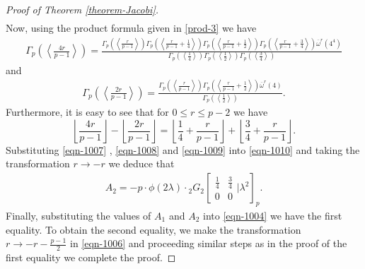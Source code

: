 \documentclass[12pt]{amsart}
\theoremstyle{plain}
\theoremstyle{definition}
\theoremstyle{remark}
\numberwithin{equation}{section}
\begin{document}
\begin{proof}[Proof of Theorem \ref{theorem-Jacobi}]
\begin{align}
\end{align}
Now, using the product formula given in \eqref{prod-3} we have 
\begin{align}\label{eqn-1007}
   \Gamma_p\left(\left\langle\frac{4r}{p-1}\right\rangle\right)=\frac{\Gamma_p\left(\left\langle\frac{r}{p-1}\right\rangle\right)\Gamma_p\left(\left\langle\frac{r}{p-1}+\frac{1}{4}\right\rangle\right)\Gamma_p\left(\left\langle\frac{r}{p-1}+\frac{1}{2}\right\rangle\right)\Gamma_p\left(\left\langle\frac{r}{p-1}+\frac{3}{4}\right\rangle\right) {\overline\omega^r(4^4)}}{\Gamma_p\left(\left\langle\frac{1}{4}\right\rangle\right)\Gamma_p\left(\left\langle\frac{1}{2}\right\rangle\right)\Gamma_p\left(\left\langle\frac{3}{4}\right\rangle\right)} 
\end{align}
and
\begin{align}\label{eqn-1008}
   \Gamma_p\left(\left\langle\frac{2r}{p-1}\right\rangle\right)=\frac{\Gamma_p\left(\left\langle\frac{r}{p-1}\right\rangle\right)\Gamma_p\left(\left\langle\frac{r}{p-1}+\frac{1}{2}\right\rangle\right) {\overline\omega^r(4)}}{\Gamma_p\left(\left\langle\frac{1}{2}\right\rangle\right)}.
\end{align}
Furthermore, it is easy to see that for $0\leq r\leq p-2$ we have
\begin{equation}\label{eqn-1009}
    \left\lfloor\frac{4r}{p-1}\right\rfloor-\left\lfloor\frac{2r}{p-1}\right\rfloor=\left\lfloor\frac{1}{4}+\frac{r}{p-1}\right\rfloor+\left\lfloor\frac{3}{4}+\frac{r}{p-1}\right\rfloor.
\end{equation}
Substituting \eqref{eqn-1007} , \eqref{eqn-1008} and \eqref{eqn-1009} into \eqref{eqn-1010} and taking the transformation $r\rightarrow-r$ we deduce that
\begin{align}\label{eqn-1011}
A_2=-p\cdot  \phi(2\lambda)\cdot {_2G_2}\left[\begin{array}{cc}
 \frac{1}{4}    & \frac{3}{4} \\
  0    & 0  \end{array}|{\lambda^2}\right]_p.
\end{align}
Finally, substituting the values of $A_1$ and $A_2$ into \eqref{eqn-1004} we have the first equality. To obtain the second equality, we make the transformation $r\rightarrow -r-\frac{p-1}{2}$ in \eqref{eqn-1006} and proceeding similar steps as in the proof of the first equality we complete the proof.
\end{proof}
\end{document}
